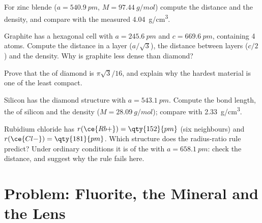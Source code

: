 \begin{exercise}[$\star\star$]\label{exo:b1:crystals-ionic-covalent:8}
For zinc blende ($a = \qty{540.9}{pm}$, $M = \qty{97.44}{g/mol}$) compute
the  distance and the density, and compare with the measured
\qty{4.04}{g/cm^3}.
\end{exercise}

\begin{exercise}[$\star\star$]\label{exo:b1:crystals-ionic-covalent:9}
Graphite has a hexagonal cell with $a = \qty{245.6}{pm}$ and
$c = \qty{669.6}{pm}$, containing 4 atoms. Compute the  distance
in a layer ($a/\sqrt3$), the distance between layers ($c/2$) and the
density. Why is graphite less dense than diamond?
\end{exercise}

\begin{exercise}[$\star\star\star$]\label{exo:b1:crystals-ionic-covalent:10}
Prove that the  of diamond is $\pi\sqrt3/16$, and explain why
the hardest material is one of the least compact.
\end{exercise}

\begin{exercise}[$\star\star\star$]\label{exo:b1:crystals-ionic-covalent:11}
Silicon has the diamond structure with $a = \qty{543.1}{pm}$. Compute
the  bond length, the  of silicon and the
density ($M = \qty{28.09}{g/mol}$); compare with \qty{2.33}{g/cm^3}.
\end{exercise}

\begin{exercise}[$\star\star\star$]\label{exo:b1:crystals-ionic-covalent:12}
Rubidium chloride has $r(\ce{Rb+}) = \qty{152}{pm}$ (six neighbours) and
$r(\ce{Cl-}) = \qty{181}{pm}$. Which structure does the radius-ratio rule
predict? Under ordinary conditions it is of the  with
$a = \qty{658.1}{pm}$: check the  distance, and suggest why the
rule fails here.
\end{exercise}

\section{Problem: Fluorite, the Mineral and the Lens}

